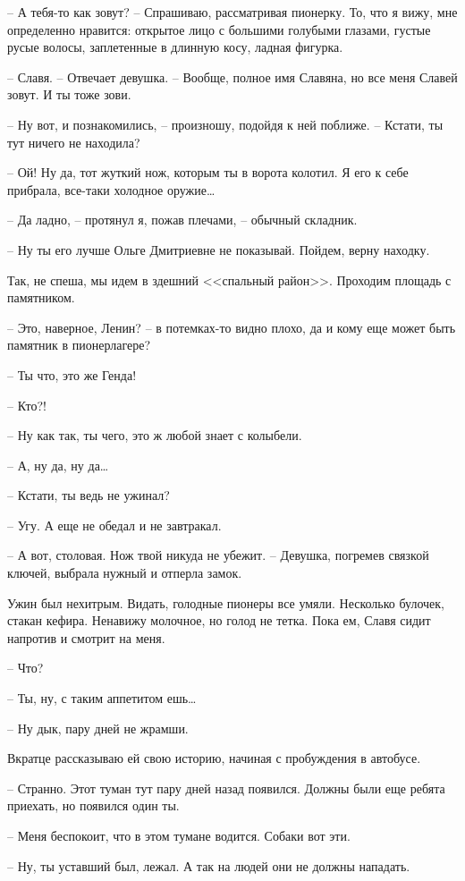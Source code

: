 \documentclass[a4paper]{book}
\begin{document}
-- А тебя-то как зовут? -- Спрашиваю, рассматривая пионерку. То, что я вижу, мне определенно нравится: открытое лицо с большими голубыми глазами, густые русые волосы, заплетенные в длинную косу, ладная фигурка.

-- Славя. -- Отвечает девушка. -- Вообще, полное имя Славяна, но все меня Славей зовут. И ты тоже зови. 

-- Ну вот, и познакомились, -- произношу, подойдя к ней поближе. -- Кстати, ты тут ничего не находила?

-- Ой! Ну да, тот жуткий нож, которым ты в ворота колотил. Я его к себе прибрала, все-таки холодное оружие\ldots

-- Да ладно, -- протянул я, пожав плечами, --  обычный складник.

-- Ну ты его лучше Ольге Дмитриевне не показывай. Пойдем, верну находку.

Так, не спеша, мы идем в здешний <<спальный район>>. Проходим площадь с памятником. 


-- Это, наверное, Ленин? -- в потемках-то видно плохо, да и кому еще может быть памятник в пионерлагере?

-- Ты что, это же Генда!

-- Кто?! 

-- Ну как так, ты чего, это ж любой знает с колыбели.

-- А, ну да, ну да\ldots

-- Кстати, ты ведь не ужинал?

-- Угу. А еще не обедал и не завтракал.

-- А вот, столовая. Нож твой никуда не убежит. -- Девушка, погремев связкой ключей, выбрала нужный и отперла замок.

Ужин был нехитрым. Видать, голодные пионеры все умяли. Несколько булочек, стакан кефира. Ненавижу молочное, но голод не тетка. Пока ем, Славя сидит напротив и смотрит на меня.


-- Что?

-- Ты, ну, с таким аппетитом ешь\ldots

-- Ну дык, пару дней не жрамши.

Вкратце рассказываю ей свою историю, начиная с пробуждения в автобусе.


-- Странно. Этот туман тут пару дней назад появился. Должны были еще ребята приехать, но появился один ты. 

-- Меня беспокоит, что в этом тумане водится. Собаки вот эти.

-- Ну, ты уставший был, лежал. А так на людей они не должны нападать. 
\end{document}
